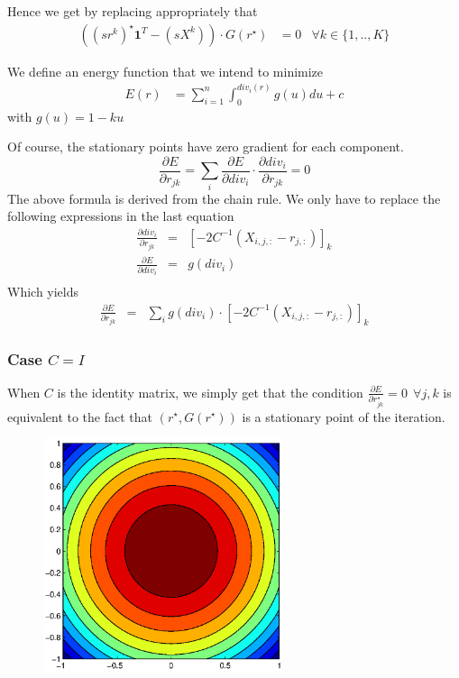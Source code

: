 \documentclass[12pt,a4paper]{article}
\begin{document}
Hence we get by replacing appropriately that
\begin{align*}
((sr^k)^{\star} \mathbf{1}^T - (sX^k))\cdot G(r^{\star}) &= 0 & \forall k\in \{1,..,K\}
\end{align*}

We define an energy function that we intend to minimize
\begin{align}
E(r) &=  \sum_{i=1}^n \int_0^{div_i(r)}g(u) du + c \label{eq:energy}
\end{align}
with $g(u) = 1 -ku$

Of course, the stationary points have zero gradient for each component.
$$
\frac{\partial E}{\partial r_{jk}} =  \sum_{i}\frac{\partial E}{\partial div_i} \cdot \frac{\partial div_i}{\partial r_{jk}} = 0
$$
The above formula is derived from the chain rule. We only have to replace the following expressions in the last equation
\begin{eqnarray*}
\frac{\partial div_i}{\partial r_{jk}} & = & \left[-2 C^{-1}(X_{i,j,:}-r_{j,:})\right]_{k} \\
\frac{\partial E}{\partial div_i} & = & g(div_i)\\
\end{eqnarray*}
Which yields
\begin{eqnarray*}
\frac{\partial E}{\partial r_{jk}} & = & \sum_{i}g(div_i) \cdot \left[-2 C^{-1}(X_{i,j,:}-r_{j,:})\right]_{k} 
\end{eqnarray*}

\subsubsection*{Case $C = I$}
When $C$ is the identity matrix, we simply get that the condition $\frac{\partial E}{\partial r^{\star}_{jk}}=0 \:\: \forall j,k$ is equivalent to the fact that $(r^{\star},G(r^{\star}))$ is a stationary point of the iteration.

\begin{figure}
\centering
\includegraphics[width = 7cm]{../images/courbes.eps}
\caption{}
\end{figure}
\end{document}
